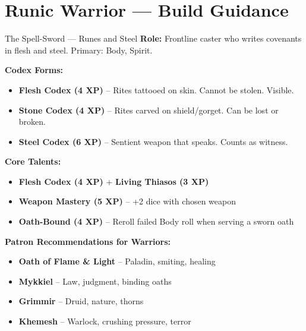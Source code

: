 \documentclass[10pt]{article}
\begin{document}
\newpage


\section*{Runic Warrior --- Build Guidance}

\begin{tipbox}{The Spell-Sword --- Runes and Steel}
    \textbf{Role:} Frontline caster who writes covenants in flesh and steel. Primary: Body, Spirit.
    
    \textbf{Codex Forms:}
    \begin{itemize}
        \item \textbf{Flesh Codex (4 XP)} -- Rites tattooed on skin. Cannot be stolen. Visible.
        \item \textbf{Stone Codex (4 XP)} -- Rites carved on shield/gorget. Can be lost or broken.
        \item \textbf{Steel Codex (6 XP)} -- Sentient weapon that speaks. Counts as witness.
    \end{itemize}
    
    \textbf{Core Talents:}
    \begin{itemize}
        \item \textbf{Flesh Codex (4 XP)} + \textbf{Living Thiasos (3 XP)}
        \item \textbf{Weapon Mastery (5 XP)} -- +2 dice with chosen weapon
        \item \textbf{Oath-Bound (4 XP)} -- Reroll failed Body roll when serving a sworn oath
    \end{itemize}
    
    \textbf{Patron Recommendations for Warriors:}
    \begin{itemize}
        \item \textbf{Oath of Flame \& Light} -- Paladin, smiting, healing
        \item \textbf{Mykkiel} -- Law, judgment, binding oaths
        \item \textbf{Grimmir} -- Druid, nature, thorns
        \item \textbf{Khemesh} -- Warlock, crushing pressure, terror
    \end{itemize}
\end{tipbox}
\end{document}
